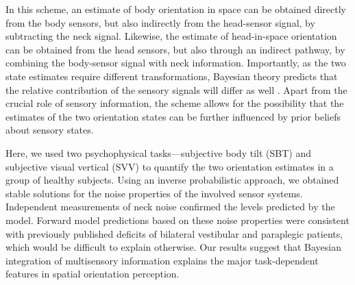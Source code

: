 In this scheme, an estimate of body orientation in space can be obtained directly from the body sensors, but also indirectly from the head-sensor signal, by subtracting the neck signal. Likewise, the estimate of head-in-space orientation can be obtained from the head sensors, but also through an indirect pathway, by combining the body-sensor signal with neck information. Importantly, as the two state estimates require different transformations, Bayesian theory predicts that the relative contribution of the sensory signals will differ as well \cite{mcguire2009}. Apart from the crucial role of sensory information, the scheme allows for the possibility that the estimates of the two orientation states can be further influenced by prior beliefs about sensory states. 

Here, we used two psychophysical tasks---subjective body tilt (SBT) and subjective visual vertical (SVV) to quantify the two orientation estimates in a group of healthy subjects. Using an inverse probabilistic approach, we obtained stable solutions for the noise properties of the involved sensor systems. Independent measurements of neck noise confirmed the levels predicted by the model. Forward model predictions based on these noise properties were consistent with previously published deficits of bilateral vestibular and paraplegic patients, which would be difficult to explain otherwise. Our results suggest that Bayesian integration of multisensory information explains the major task-dependent features in spatial orientation perception. 
